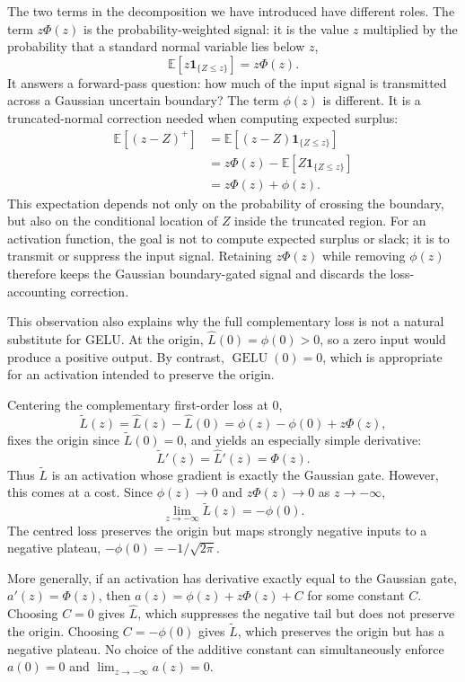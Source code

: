 \documentclass[11pt]{article}
\begin{document}
The two terms in the decomposition we have introduced have different roles. The term $z\Phi(z)$ is the probability-weighted signal: it is the value $z$ multiplied by the probability that a standard normal variable lies below $z$,
$$
\mathbb{E}[z\mathbf{1}_{\{Z\le z\}}]=z\Phi(z).
$$
It answers a forward-pass question: how much of the input signal is transmitted across a Gaussian uncertain boundary? The term $\phi(z)$ is different. It is a truncated-normal correction needed when computing expected surplus:
\begin{align*}
\mathbb{E}[(z-Z)^+]
&=
\mathbb{E}[(z-Z)\mathbf{1}_{\{Z\le z\}}]
\\&=
z\Phi(z)-\mathbb{E}[Z\mathbf{1}_{\{Z\le z\}}]
\\&=
z\Phi(z)+\phi(z).
\end{align*}
This expectation depends not only on the probability of crossing the boundary, but also on the conditional location of $Z$ inside the truncated region. For an activation function, the goal is not to compute expected surplus or slack; it is to transmit or suppress the input signal. Retaining $z\Phi(z)$ while removing $\phi(z)$ therefore keeps the Gaussian boundary-gated signal and discards the loss-accounting correction.

This observation also explains why the full complementary loss is not a natural substitute for GELU. At the origin, $\widehat{L}(0)=\phi(0)>0$, so a zero input would produce a positive output. By contrast, $\operatorname{GELU}(0)=0$, which is appropriate for an activation intended to preserve the origin.

Centering the complementary first-order loss at 0,
$$
\widetilde{L}(z)
=
\widehat{L}(z)-\widehat{L}(0)
=
\phi(z)-\phi(0)+z\Phi(z),
$$
fixes the origin since $\widetilde{L}(0)=0$, and yields an especially simple derivative:
$$
\widetilde{L}'(z)=\widehat{L}'(z)=\Phi(z).
$$
Thus $ \widetilde{L} $ is an activation whose gradient is exactly the Gaussian gate.
However, this comes at a cost. Since $\phi(z)\to 0$ and $z\Phi(z)\to 0$ as $z\to -\infty$,
$$
\lim_{z\to -\infty}\widetilde{L}(z)
=
-\phi(0).
$$
The centred loss preserves the origin but maps strongly negative inputs to a negative plateau, $-\phi(0)=-1/\sqrt{2\pi}$. 

More generally, if an activation has derivative exactly equal to the Gaussian gate, $a'(z)=\Phi(z)$, then $a(z)=\phi(z)+z\Phi(z)+C$ for some constant $ C $. Choosing $ C=0 $ gives $ \widehat{L} $, which suppresses the negative tail but does not preserve the origin. Choosing $ C=-\phi(0) $ gives $ \widetilde{L} $, which preserves the origin but has a negative plateau. No choice of the additive constant can simultaneously enforce $a(0)=0$ and $\lim_{z\to -\infty}a(z)=0$.
\end{document}
